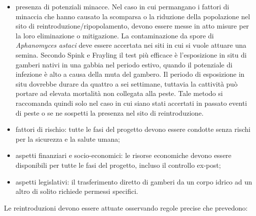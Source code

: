 \documentclass[11pt,a4paper,italian,twoside,openany]{memoir}
\begin{document}
\begin{itemize}
  \item presenza di potenziali minacce. Nel caso in cui permangano i fattori di minaccia che hanno causato la scomparsa o la riduzione della popolazione nel sito di reintroduzione/ripopolamento, devono essere messe in atto misure per la loro eliminazione o mitigazione. La contaminazione da spore di \emph{Aphanomyces astaci} \cite{Schulz 2002} deve essere accertata nei siti in cui si vuole attuare una semina. Secondo Spink e Frayling \cite{Spink 2000} il test più efficace è l'esposizione in situ di gamberi nativi in una gabbia nel periodo estivo, quando il potenziale di infezione è alto a causa della muta del gambero. Il periodo di esposizione in situ dovrebbe durare da quattro a sei settimane, tuttavia la cattività può portare ad elevata mortalità non collegata alla peste. Tale metodo si raccomanda quindi solo nel caso in cui siano stati accertati in passato eventi di peste o se ne sospetti la presenza nel sito di reintroduzione.
  \item fattori di rischio: tutte le fasi del progetto devono essere condotte senza rischi per la sicurezza e la salute umana;
  \item aspetti finanziari e socio-economici: le risorse economiche devono essere disponibili per tutte le fasi del progetto, incluso il controllo ex-post;
  \item aspetti legislativi: il trasferimento diretto di gamberi da un corpo idrico ad un altro di solito richiede permessi specifici.
\end{itemize}
Le reintroduzioni devono essere attuate osservando regole precise che prevedono: 
\end{document}
